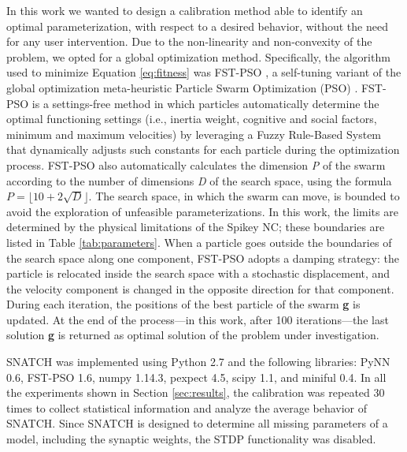 \documentclass[utf8]{frontiersFPHY} %
\newcommand {\name}{SNATCH}
\begin{document}
In this work we wanted to design a calibration method able to identify an optimal parameterization, with respect to a desired behavior, without the need for any user intervention. 
Due to the non-linearity and non-convexity of the problem, we opted for a global optimization method. Specifically, the algorithm used to minimize Equation \ref{eq:fitness} was FST-PSO \cite{Nobile2018}, a self-tuning variant of the global optimization meta-heuristic Particle Swarm Optimization (PSO) \cite{Kennedy1995}.
FST-PSO is a settings-free method in which particles automatically determine the optimal functioning settings (i.e., inertia weight, cognitive and social factors, minimum and maximum velocities) by leveraging a Fuzzy Rule-Based System that dynamically adjusts such constants for each particle during the optimization process. 
FST-PSO also automatically calculates the dimension \textit{P} of the swarm according to the number of dimensions \textit{D} of the search space, using the formula $\textit{P} = \lfloor 10 + 2\sqrt{\textit{D}}\rfloor$. 
The search space, in which the swarm can move, is bounded to avoid the exploration of unfeasible parameterizations.
In this work, the limits are determined by the physical limitations of the Spikey NC; these boundaries are listed in Table \ref{tab:parameters}.
When a particle goes outside the boundaries of the search space along one component, FST-PSO adopts  a damping strategy: the particle is relocated inside the search space with a stochastic displacement, and the velocity component is changed in the opposite direction for that component. 
During each iteration, the positions of the best particle of the swarm \textbf{g} is updated.
At the end of the process---in this work, after 100 iterations---the last solution \textbf{g} is returned as optimal solution of the problem under investigation.

\name{} was implemented using Python 2.7 and the following libraries:  PyNN 0.6, FST-PSO 1.6, numpy 1.14.3, pexpect 4.5, scipy 1.1, and miniful 0.4.
In all the experiments shown in Section \ref{sec:results}, the calibration was repeated 30 times to collect statistical information and analyze the average behavior of \name{}.
Since SNATCH is designed to determine all missing parameters of a model, including the synaptic weights, the STDP functionality was disabled.
\end{document}
